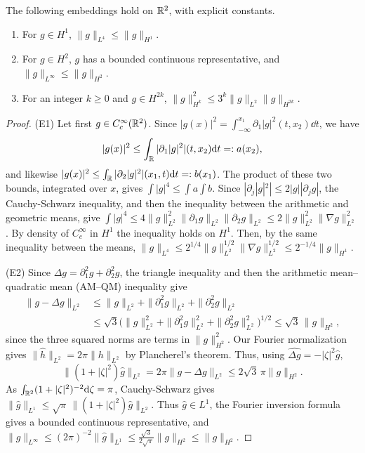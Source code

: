 \begin{lemma}
\label{lem:embed}
The following embeddings hold on $\mathbb{R}^2$, with explicit constants.
\begin{enumerate}[label=\textup{(E\arabic*)}]
\item For $g\in H^1$, $\|g\|_{L^4}\le\|g\|_{H^1}$.
\item For $g\in H^2$, $g$ has a bounded continuous
  representative, and $\|g\|_{L^\infty}\le\|g\|_{H^2}$.
\item For an integer $k\ge0$ and $g\in H^{2k}$,
  $\|g\|_{H^k}^2\le3^k\|g\|_{L^2}\|g\|_{H^{2k}}$.
\end{enumerate}
\end{lemma}

\begin{proof}
(E1) Let first $g\in C_c^\infty(\mathbb{R}^2)$. Since
$|g(x)|^2=\int_{-\infty}^{x_1}\partial_1|g|^2(t,x_2)\dd t$, we have
\[
|g(x)|^2\le\int_{\mathbb{R}}|\partial_1|g|^2|(t,x_2)\dd t=:a(x_2),
\]
and likewise
$|g(x)|^2\le\int_{\mathbb{R}}|\partial_2|g|^2|(x_1,t)\dd t=:b(x_1)$. The product of
these two bounds, integrated over $x$, gives
$\int|g|^4\le\int a\int b$. Since $|\partial_j|g|^2|\le2|g||\partial_jg|$,
the Cauchy-Schwarz inequality, and then the inequality between the arithmetic
and geometric means, give
$\int|g|^4\le4\|g\|_{L^2}^2\allowbreak\|\partial_1g\|_{L^2}\|\partial_2g\|_{L^2}\le2\|g\|_{L^2}^2\|\nabla g\|_{L^2}^2$.
By density of $C_c^\infty$ in $H^1$ the inequality holds on $H^1$. Then, by the
same inequality between the means,
$\|g\|_{L^4}\le2^{1/4}\|g\|_{L^2}^{1/2}\|\nabla g\|_{L^2}^{1/2}\le2^{-1/4}\|g\|_{H^1}$.

(E2) Since $\Delta g=\partial_1^2g+\partial_2^2g$, the triangle inequality
and then the arithmetic mean--quadratic mean (AM--QM) inequality give
\[
\begin{aligned}
\|g-\Delta g\|_{L^2}
&\le\|g\|_{L^2}+\|\partial_1^2g\|_{L^2}+\|\partial_2^2g\|_{L^2}\\
&\le\sqrt3\big(\|g\|_{L^2}^2+\|\partial_1^2g\|_{L^2}^2
+\|\partial_2^2g\|_{L^2}^2\big)^{1/2}
\le\sqrt3\,\|g\|_{H^2},
\end{aligned}
\]
since the three squared norms are terms in $\|g\|_{H^2}^2$.
Our Fourier normalization gives $\|\hat h\|_{L^2}=2\pi\|h\|_{L^2}$ by
Plancherel's theorem. Thus, using $\widehat{\Delta g}=-|\zeta|^2\hat g$,
\[
\|(1+|\zeta|^2)\hat g\|_{L^2}=2\pi\|g-\Delta g\|_{L^2}
\le2\sqrt3\,\pi\|g\|_{H^2}.
\]
As $\int_{\mathbb{R}^2}(1+|\zeta|^2)^{-2}\dd\zeta=\pi$, Cauchy-Schwarz gives
$\|\hat g\|_{L^1}\le\sqrt\pi\,\|(1+|\zeta|^2)\hat g\|_{L^2}$. Thus $\hat g\in L^1$, the
Fourier inversion formula gives a bounded continuous representative, and
$\|g\|_{L^\infty}\le(2\pi)^{-2}\|\hat g\|_{L^1}\le\frac{\sqrt3}{2\sqrt\pi}\|g\|_{H^2}\le\|g\|_{H^2}$.


\end{proof}
